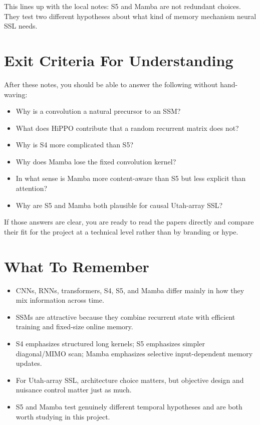 This lines up with the local notes: S5 and Mamba are not redundant choices. They test two
different hypotheses about what kind of memory mechanism neural SSL needs.

\section{Exit Criteria For Understanding}

After these notes, you should be able to answer the following without hand-waving:

\begin{itemize}
  \item Why is a convolution a natural precursor to an SSM?
  \item What does HiPPO contribute that a random recurrent matrix does not?
  \item Why is S4 more complicated than S5?
  \item Why does Mamba lose the fixed convolution kernel?
  \item In what sense is Mamba more content-aware than S5 but less explicit than
  attention?
  \item Why are S5 and Mamba both plausible for causal Utah-array SSL?
\end{itemize}

If those answers are clear, you are ready to read the papers directly and compare their
fit for the project at a technical level rather than by branding or hype.

\section{What To Remember}

\begin{itemize}
  \item CNNs, RNNs, transformers, S4, S5, and Mamba differ mainly in how they mix
  information across time.
  \item SSMs are attractive because they combine recurrent state with efficient training
  and fixed-size online memory.
  \item S4 emphasizes structured long kernels; S5 emphasizes simpler diagonal/MIMO scan;
  Mamba emphasizes selective input-dependent memory updates.
  \item For Utah-array SSL, architecture choice matters, but objective design and nuisance
  control matter just as much.
  \item S5 and Mamba test genuinely different temporal hypotheses and are both worth
  studying in this project.
\end{itemize}
